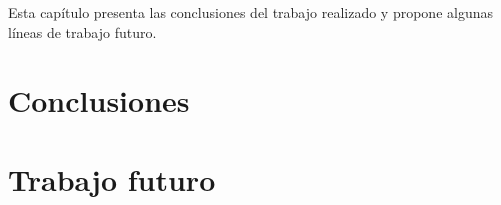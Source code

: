 Esta capítulo presenta las conclusiones del trabajo realizado y propone algunas líneas de trabajo futuro.

\section{Conclusiones\label{SEC:CONC}}


\section{Trabajo futuro\label{SEC:TRABFUT}}
